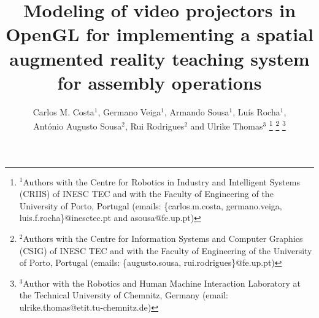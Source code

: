 









\title{\LARGE \bf
Modeling of video projectors in OpenGL for implementing a spatial augmented reality teaching system for assembly operations
}

\author{Carlos M. Costa$^{1}$, Germano Veiga$^{1}$, Armando Sousa$^{1}$, Luís Rocha$^{1}$,\\António Augusto Sousa$^{2}$, Rui Rodrigues$^{2}$ and Ulrike Thomas$^{3}$%
\thanks{$^{1}$Authors with the Centre for Robotics in Industry and Intelligent Systems (CRIIS) of INESC TEC and with the Faculty of Engineering of the University of Porto, Portugal (emails: \{carlos.m.costa, germano.veiga, luis.f.rocha\}@inesctec.pt and asousa@fe.up.pt)}%
\thanks{$^{2}$Authors with the Centre for Information Systems and Computer Graphics (CSIG) of INESC TEC and with the Faculty of Engineering of the University of Porto, Portugal (emails: \{augusto.sousa, rui.rodrigues\}@fe.up.pt)}%
\thanks{$^{3}$Author with the Robotics and Human Machine Interaction Laboratory at the Technical University of Chemnitz, Germany (email: ulrike.thomas@etit.tu-chemnitz.de)}%
}


\maketitle



















